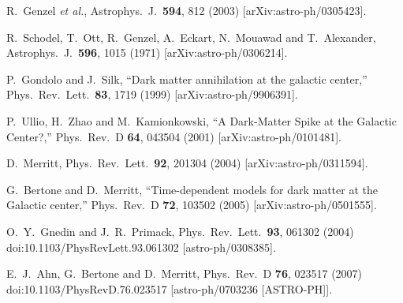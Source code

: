 \documentclass[11pt]{article}
\begin{document}
\begin{thebibliography}{99}
  R.~Genzel {\it et al.},
  Astrophys.\ J.\  {\bf 594}, 812 (2003)
  [arXiv:astro-ph/0305423].

  R.~Schodel, T.~Ott, R.~Genzel, A.~Eckart, N.~Mouawad and T.~Alexander,
  Astrophys.\ J.\  {\bf 596}, 1015 (1971)
  [arXiv:astro-ph/0306214].

  P.~Gondolo and J.~Silk,
  ``Dark matter annihilation at the galactic center,''
  Phys.\ Rev.\ Lett.\  {\bf 83}, 1719 (1999)
  [arXiv:astro-ph/9906391].
 

  P.~Ullio, H.~Zhao and M.~Kamionkowski,
  ``A Dark-Matter Spike at the Galactic Center?,''
  Phys.\ Rev.\  D {\bf 64}, 043504 (2001)
  [arXiv:astro-ph/0101481].
  
  D.~Merritt,
  Phys.\ Rev.\ Lett.\  {\bf 92}, 201304 (2004)
  [arXiv:astro-ph/0311594].

  G.~Bertone and D.~Merritt,
  ``Time-dependent models for dark matter at the Galactic center,''
  Phys.\ Rev.\  D {\bf 72}, 103502 (2005)
  [arXiv:astro-ph/0501555].
  
  O.~Y.~Gnedin and J.~R.~Primack,
  Phys.\ Rev.\ Lett.\  {\bf 93}, 061302 (2004)
  doi:10.1103/PhysRevLett.93.061302
  [astro-ph/0308385].

  
  E.~J.~Ahn, G.~Bertone and D.~Merritt,
  Phys.\ Rev.\ D {\bf 76}, 023517 (2007)
  doi:10.1103/PhysRevD.76.023517
  [astro-ph/0703236 [ASTRO-PH]].
  

\end{thebibliography}
\end{document}
